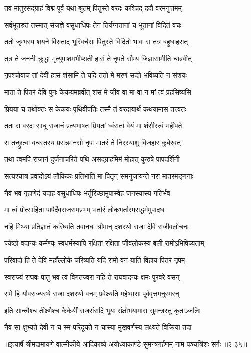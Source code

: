 \twolineshloka
{तव मातुरसद्ग्राहं विद्म पूर्वं यथा श्रुतम्}
{पितुस्ते वरदः कश्चिद् ददौ वरमनुत्तमम्} %

\twolineshloka
{सर्वभूतरुतं तस्मात् संजज्ञे वसुधाधिपः}
{तेन तिर्यग्गतानां च भूतानां विदितं वचः} %

\twolineshloka
{ततो जृम्भस्य शयने विरुताद् भूरिवर्चसः}
{पितुस्ते विदितो भावः स तत्र बहुधाहसत्} %

\twolineshloka
{तत्र ते जननी क्रुद्धा मृत्युपाशमभीप्सती}
{हासं ते नृपते सौम्य जिज्ञासामीति चाब्रवीत्} %

\twolineshloka
{नृपश्चोवाच तां देवीं हासं शंसामि ते यदि}
{ततो मे मरणं सद्यो भविष्यति न संशयः} %

\twolineshloka
{माता ते पितरं देवि पुनः केकयमब्रवीत्}
{शंस मे जीव वा मा वा न मां त्वं प्रहसिष्यसि} %

\twolineshloka
{प्रियया च तथोक्तः स केकयः पृथिवीपतिः}
{तस्मै तं वरदायार्थं कथयामास तत्त्वतः} %

\twolineshloka
{ततः स वरदः साधू राजानं प्रत्यभाषत}
{म्रियतां ध्वंसतां वेयं मा शंसीस्त्वं महीपते} %

\twolineshloka
{स तच्छ्रुत्वा वचस्तस्य प्रसन्नमनसो नृपः}
{मातरं ते निरस्याशु विजहार कुबेरवत्} %

\twolineshloka
{तथा त्वमपि राजानं दुर्जनाचरिते पथि}
{असद्ग्राहमिमं मोहात् कुरुषे पापदर्शिनी} %

\twolineshloka
{सत्यश्चात्र प्रवादोऽयं लौकिकः प्रतिभाति मा}
{पितॄन् समनुजायन्ते नरा मातरमङ्गनाः} %

\twolineshloka
{नैवं भव गृहाणेदं यदाह वसुधाधिपः}
{भर्तुरिच्छामुपास्वेह जनस्यास्य गतिर्भव} %

\twolineshloka
{मा त्वं प्रोत्साहिता पापैर्देवराजसमप्रभम्}
{भर्तारं लोकभर्तारमसद्धर्ममुपादध} %

\twolineshloka
{नहि मिथ्या प्रतिज्ञातं करिष्यति तवानघः}
{श्रीमान् दशरथो राजा देवि राजीवलोचनः} %

\twolineshloka
{ज्येष्ठो वदान्यः कर्मण्यः स्वधर्मस्यापि रक्षिता}
{रक्षिता जीवलोकस्य बली रामोऽभिषिच्यताम्} %

\twolineshloka
{परिवादो हि ते देवि महाँल्लोके चरिष्यति}
{यदि रामो वनं याति विहाय पितरं नृपम्} %

\twolineshloka
{स्वराज्यं राघवः पातु भव त्वं विगतज्वरा}
{नहि ते राघवादन्यः क्षमः पुरवरे वसन्} %

\twolineshloka
{रामे हि यौवराज्यस्थे राजा दशरथो वनम्}
{प्रवेक्ष्यति महेष्वासः पूर्ववृत्तमनुस्मरन्} %

\twolineshloka
{इति सान्त्वैश्च तीक्ष्णैश्च कैकेयीं राजसंसदि}
{भूयः संक्षोभयामास सुमन्त्रस्तु कृताञ्जलिः} %

\twolineshloka
{नैव सा क्षुभ्यते देवी न च स्म परिदूयते}
{न चास्या मुखवर्णस्य लक्ष्यते विक्रिया तदा} %


॥इत्यार्षे श्रीमद्रामायणे वाल्मीकीये आदिकाव्ये अयोध्याकाण्डे सुमन्त्रगर्हणम् नाम पञ्चत्रिंशः सर्गः ॥२-३५॥
